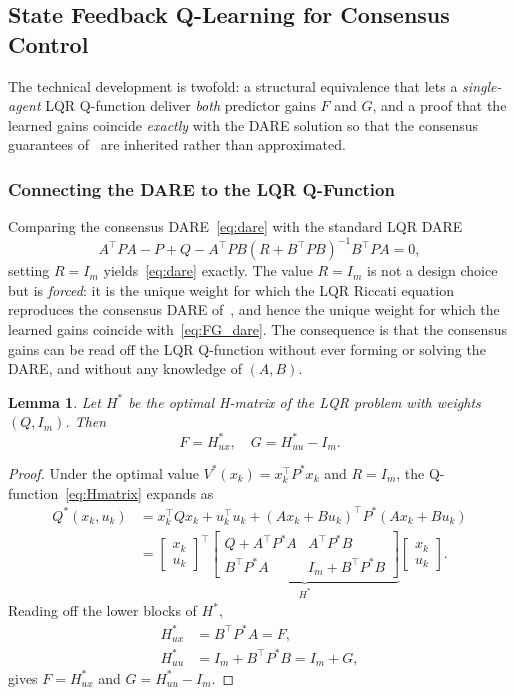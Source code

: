 \documentclass[12pt]{elsarticle}
\newtheorem{lemma}{Lemma}
\theoremstyle{remark}
\begin{document}
\subsection{State Feedback Q-Learning for Consensus Control}
\label{sec:sf_ql}
The technical development is twofold: a structural equivalence that lets a \emph{single-agent} LQR Q-function deliver \emph{both} predictor gains $F$ and $G$, and a proof that the learned gains coincide \emph{exactly} with the DARE solution so that the consensus guarantees of~\cite{cacace2024} are inherited rather than approximated.
\subsubsection{Connecting the DARE to the LQR Q-Function}
\label{subsec:dare_lqr}
Comparing the consensus DARE~\eqref{eq:dare} with the standard LQR DARE
\begin{equation}
A^\top PA - P + Q - A^\top PB(R + B^\top PB)^{-1}B^\top PA = 0,
\label{eq:dare_lqr}
\end{equation}
setting $R = I_m$ yields~\eqref{eq:dare} exactly. The value $R=I_m$ is not a design choice but is \emph{forced}: it is the unique weight for which the LQR Riccati equation reproduces the consensus DARE of~\cite{cacace2024}, and hence the unique weight for which the learned gains coincide with~\eqref{eq:FG_dare}. The consequence is that the consensus gains can be read off the LQR Q-function without ever forming or solving the DARE, and without any knowledge of $(A,B)$.
\begin{lemma}
\label{prop:FG_recovery}
Let $H^*$ be the optimal H-matrix of the LQR problem with weights $(Q, I_m)$. Then
\begin{equation}
F = H_{ux}^*, \quad G = H_{uu}^* - I_m.
\label{eq:FG_from_H}
\end{equation}
\end{lemma}
\begin{proof}
Under the optimal value $V^*(x_k)=x_k^\top P^* x_k$ and $R=I_m$, the Q-function~\eqref{eq:Hmatrix} expands as
\begin{align*}
Q^*(x_k,u_k)
&= x_k^\top Q x_k + u_k^\top u_k + (Ax_k+Bu_k)^\top P^*(Ax_k+Bu_k)\\
&= \begin{bmatrix} x_k\\ u_k\end{bmatrix}^{\!\top}
\underbrace{\begin{bmatrix} Q+A^\top P^* A & A^\top P^* B\\[1pt] B^\top P^* A & I_m + B^\top P^* B\end{bmatrix}}_{H^*}
\begin{bmatrix} x_k\\ u_k\end{bmatrix}.
\end{align*}
Reading off the lower blocks of $H^*$,
\begin{align*}
H_{ux}^* &= B^\top P^* A = F,\\
H_{uu}^* &= I_m + B^\top P^* B = I_m + G,
\end{align*}
gives $F = H_{ux}^*$ and $G = H_{uu}^* - I_m$.
\end{proof}
\end{document}
